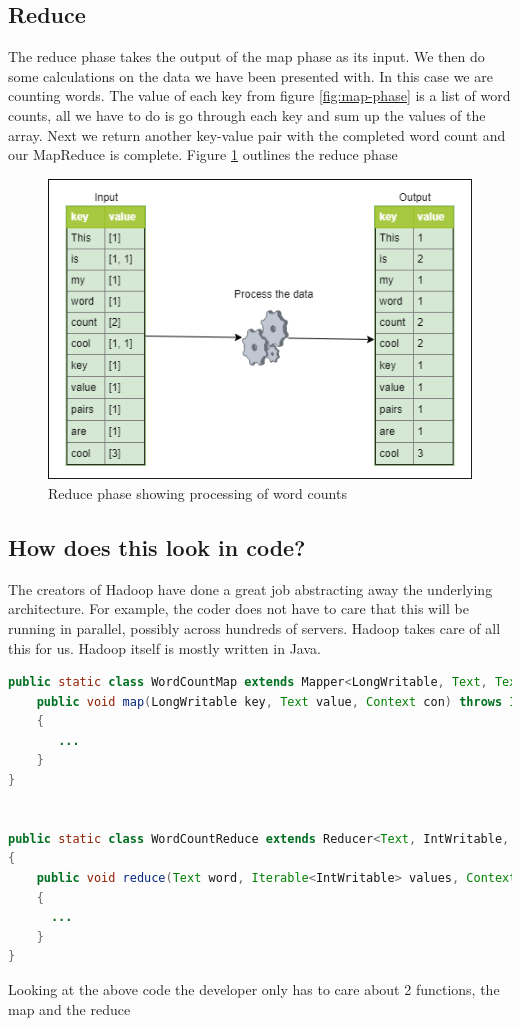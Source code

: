 \subsection{Reduce}

The reduce phase takes the output of the map phase as its input. We then do some calculations on the data we have been presented with. In this case we are counting words. The value of each key from figure \ref{fig:map-phase} is a list of word counts, all we have to do is go through each key and sum up the values of the array. Next we return another key-value pair with the completed word count and our MapReduce is complete. Figure \ref{fig:reduce-phase} outlines the reduce phase

\begin{figure}[H]
  \includegraphics[width=\linewidth]{./images/reduce-phase.png}
  \caption{Reduce phase showing processing of word counts}
  \label{fig:reduce-phase}
\end{figure}

\subsection{How does this look in code?}

The creators of Hadoop have done a great job abstracting away the underlying architecture. For example, the coder does not have to care that this will be running in parallel, possibly across hundreds of servers. Hadoop takes care of all this for us. 
Hadoop itself is mostly written in Java. 

\begin{lstlisting}[language=Java]
public static class WordCountMap extends Mapper<LongWritable, Text, Text, IntWritable>{
    public void map(LongWritable key, Text value, Context con) throws IOException,     InterruptedException
    {
       ...
    }
}


public static class WordCountReduce extends Reducer<Text, IntWritable, Text, IntWritable>
{
    public void reduce(Text word, Iterable<IntWritable> values, Context con) throws  IOException, InterruptedException
    {
      ...
    }
}

\end{lstlisting}

Looking at the above code the developer only has to care about 2 functions, the map and the reduce